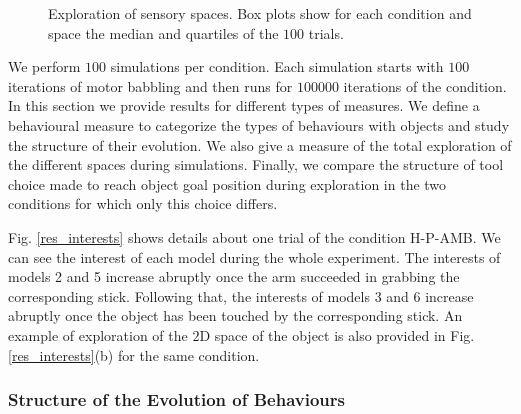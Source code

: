 \documentclass[10pt,letterpaper]{article}
\begin{document}
\begin{figure}[t]
		\caption{Exploration of sensory spaces. Box plots show for each condition and space the median and quartiles of the $100$ trials.}
		\label{res_explo}
	\end{figure}
		
	We perform $100$ simulations per condition. 
	Each simulation starts with $100$ iterations of motor babbling and then runs for $100000$ iterations of the condition.
	In this section we provide results for different types of measures. 
	We define a behavioural measure to categorize the types of behaviours with objects and study the structure of their evolution.
	We also give a measure of the total exploration of the different spaces during simulations.
	Finally, we compare the structure of tool choice made to reach object goal position during exploration in the two conditions for which only this choice differs.
		
	Fig. \ref{res_interests} shows details about one trial of the condition H-P-AMB. 
	We can see the interest of each model during the whole experiment.
	The interests of models 2 and 5 increase abruptly once the arm succeeded in grabbing the corresponding stick.
	Following that, the interests of models 3 and 6 increase abruptly once the object has been touched by the corresponding stick.
	An example of exploration of the $2$D space of the object is also provided in Fig. \ref{res_interests}(b) for the same condition.
	


	
	\subsubsection{Structure of the Evolution of Behaviours}
	
\end{document}
